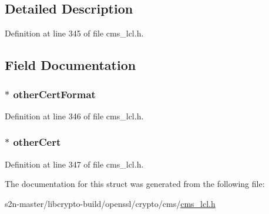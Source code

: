 \subsection{Detailed Description}


Definition at line 345 of file cms\+\_\+lcl.\+h.



\subsection{Field Documentation}
\subsubsection[{\texorpdfstring{other\+Cert\+Format}{otherCertFormat}}]{$\ast$ other\+Cert\+Format}\hypertarget{struct_c_m_s___other_certificate_format__st_ae67b5d73ea45934be7d0e5053733498b}{}\label{struct_c_m_s___other_certificate_format__st_ae67b5d73ea45934be7d0e5053733498b}


Definition at line 346 of file cms\+\_\+lcl.\+h.

\subsubsection[{\texorpdfstring{other\+Cert}{otherCert}}]{$\ast$ other\+Cert}\hypertarget{struct_c_m_s___other_certificate_format__st_a6b54acc480ef7c7acc31bcff86ea4805}{}\label{struct_c_m_s___other_certificate_format__st_a6b54acc480ef7c7acc31bcff86ea4805}


Definition at line 347 of file cms\+\_\+lcl.\+h.



The documentation for this struct was generated from the following file\+:\begin{DoxyCompactItemize}
\item 
s2n-\/master/libcrypto-\/build/openssl/crypto/cms/\hyperlink{cms__lcl_8h}{cms\+\_\+lcl.\+h}\end{DoxyCompactItemize}
